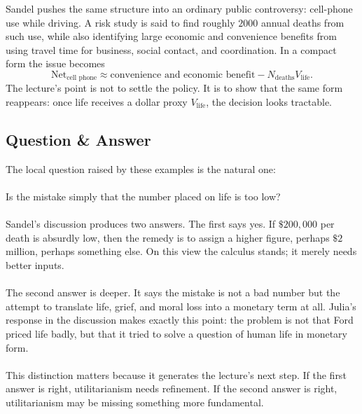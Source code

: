 Sandel pushes the same structure into an ordinary public controversy: cell-phone use while driving. A risk study is said to find roughly \(2000\) annual deaths from such use, while also identifying large economic and convenience benefits from using travel time for business, social contact, and coordination. In a compact form the issue becomes
\begin{equation}
\text{Net}_{\text{cell phone}}
\approx
\text{convenience and economic benefit}
-
N_{\text{deaths}}V_{\text{life}}.
\end{equation}
The lecture's point is not to settle the policy. It is to show that the same form reappears: once life receives a dollar proxy \(V_{\text{life}}\), the decision looks tractable.

\subsection{Question \& Answer}

The local question raised by these examples is the natural one:

\paragraph{}
Is the mistake simply that the number placed on life is too low?

\paragraph{}
Sandel's discussion produces two answers. The first says yes. If \(\$200{,}000\) per death is absurdly low, then the remedy is to assign a higher figure, perhaps \(\$2\) million, perhaps something else. On this view the calculus stands; it merely needs better inputs.

\paragraph{}
The second answer is deeper. It says the mistake is not a bad number but the attempt to translate life, grief, and moral loss into a monetary term at all. Julia's response in the discussion makes exactly this point: the problem is not that Ford priced life badly, but that it tried to solve a question of human life in monetary form.

\paragraph{}
This distinction matters because it generates the lecture's next step. If the first answer is right, utilitarianism needs refinement. If the second answer is right, utilitarianism may be missing something more fundamental.

